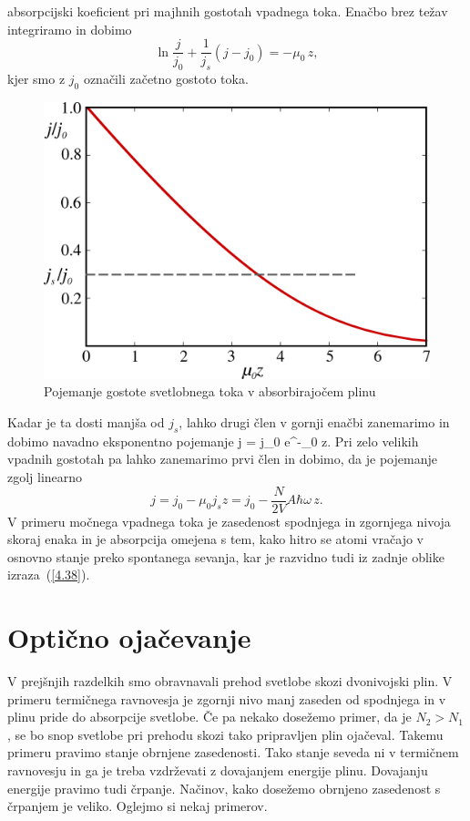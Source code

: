 absorpcijski koeficient pri majhnih gostotah vpadnega toka.
Enačbo brez težav integriramo in dobimo 
\begin{equation}
\ln\frac{j}{j_{0}}+\frac{1}{j_{s}}(j-j_{0})=-\mu_{0}\, z,\label{4.37}
\end{equation}
kjer smo z $j_{0}$ označili začetno gostoto toka. 
\begin{figure}[h]
\centering
\includegraphics[width=8truecm]{slike/05_jabs.png}
\caption{Pojemanje gostote svetlobnega toka v absorbirajočem plinu}
\label{fig:abs2}
\end{figure}
Kadar je ta dosti
manjša od $j_{s}$, lahko drugi člen v gornji enačbi zanemarimo in dobimo 
navadno eksponentno pojemanje
\beq
j = j_0 e^{-\mu_0 z}.
\eeq
Pri zelo velikih vpadnih gostotah pa lahko zanemarimo prvi člen in dobimo, 
da je pojemanje zgolj linearno
\begin{equation}
j=j_{0}-\mu_{0}j_{s}z=j_{0}-\frac{N}{2V}A\hbar\omega\, z.
\label{4.38}
\end{equation}
V primeru močnega vpadnega toka je zasedenost spodnjega in zgornjega nivoja skoraj
enaka in je absorpcija omejena s tem, kako hitro se atomi vračajo
v osnovno stanje preko spontanega sevanja, kar je razvidno tudi iz
zadnje oblike izraza~(\ref{4.38}).

\section{Optično ojačevanje}
V prejšnjih razdelkih smo obravnavali prehod svetlobe skozi dvonivojski plin. V primeru
termičnega ravnovesja je zgornji nivo manj zaseden od spodnjega in v plinu pride
do absorpcije svetlobe. Če pa nekako dosežemo primer, da je $N_{2}>N_{1}$, 
se bo snop svetlobe pri prehodu skozi tako pripravljen plin ojačeval. 
Takemu primeru pravimo stanje obrnjene zasedenosti. 
Tako stanje seveda ni v termičnem ravnovesju in ga je treba vzdrževati z dovajanjem 
energije plinu. Dovajanju energije pravimo tudi črpanje. 
Načinov, kako dosežemo obrnjeno zasedenost s črpanjem je veliko. Oglejmo 
si nekaj primerov. 

